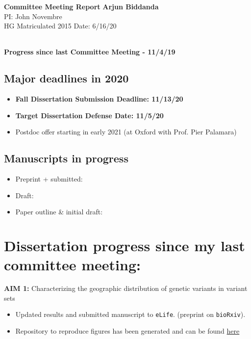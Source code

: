 \documentclass[a4paper, 10.5pt]{article}
\begin{document}
\noindent
\large\textbf{Committee Meeting Report} \hfill \textbf{Arjun Biddanda} \\
\normalsize  \hfill PI: John Novembre  \\
HG Matriculated 2015 \hfill Date: 6/16/20 \\
\noindent\makebox[\linewidth]{\rule{\paperwidth}{0.4pt}}

\large\textbf{\\Progress since last Committee Meeting - 11/4/19}

\subsection*{Major deadlines in 2020}
\begin{itemize}
    \item \textbf{Fall Dissertation Submission Deadline: 11/13/20}
    \item \textbf{Target Dissertation Defense Date: 11/5/20}
    \item Postdoc offer starting in early 2021 (at Oxford with Prof. Pier Palamara)
\end{itemize}

\subsection*{Manuscripts in progress}
\begin{itemize}
		\item Preprint + submitted: 
    \item Draft: 
    \item Paper outline \& initial draft: 
\end{itemize}

\section*{Dissertation progress since my last committee meeting:}
 \textbf{AIM 1:} Characterizing the geographic distribution of genetic variants in variant sets \\
 \begin{itemize}
   \item Updated results and submitted manuscript to \texttt{eLife}. (preprint on \texttt{bioRxiv}).
   \item Repository to reproduce figures has been generated and can be found \href{https://github.com/aabiddanda/geovar\_rep\_paper}{here}
 \end{itemize}
 
\end{document}
